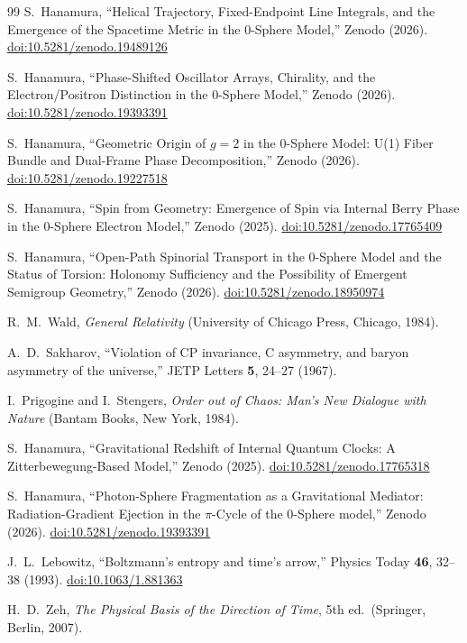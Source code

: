 \documentclass[%
 reprint, amsmath,amssymb, aps, prb, ]{revtex4-2}
\numberwithin{equation}{section}
\begin{document}
\begin{thebibliography}{99}
S.~Hanamura, ``Helical Trajectory, Fixed-Endpoint Line Integrals, and the Emergence of the Spacetime Metric in the 0-Sphere Model,'' Zenodo (2026). \href{https://doi.org/10.5281/zenodo.19489126}{doi:10.5281/zenodo.19489126}

S.~Hanamura, ``Phase-Shifted Oscillator Arrays, Chirality, and the Electron/Positron Distinction in the 0-Sphere Model,'' Zenodo (2026). \href{https://doi.org/10.5281/zenodo.19393391}{doi:10.5281/zenodo.19393391}

S.~Hanamura, ``Geometric Origin of $g=2$ in the 0-Sphere Model: U(1) Fiber Bundle and Dual-Frame Phase Decomposition,'' Zenodo (2026). \href{https://doi.org/10.5281/zenodo.19227518}{doi:10.5281/zenodo.19227518}

S.~Hanamura, ``Spin from Geometry: Emergence of Spin via Internal Berry Phase in the 0-Sphere Electron Model,'' Zenodo (2025). \href{https://doi.org/10.5281/zenodo.17765409}{doi:10.5281/zenodo.17765409}

S.~Hanamura, ``Open-Path Spinorial Transport in the 0-Sphere Model and the Status of Torsion: Holonomy Sufficiency and the Possibility of Emergent Semigroup Geometry,'' Zenodo (2026). \href{https://doi.org/10.5281/zenodo.18950974}{doi:10.5281/zenodo.18950974}

R.~M.~Wald, \textit{General Relativity} (University of Chicago Press, Chicago, 1984).

A.~D.~Sakharov, ``Violation of CP invariance, C asymmetry, and baryon asymmetry of the universe,'' JETP Letters \textbf{5}, 24--27 (1967).

I.~Prigogine and I.~Stengers, \textit{Order out of Chaos: Man's New Dialogue with Nature} (Bantam Books, New York, 1984).

S.~Hanamura, ``Gravitational Redshift of Internal Quantum Clocks: A Zitterbewegung-Based Model,'' Zenodo (2025). \href{https://doi.org/10.5281/zenodo.17765318}{doi:10.5281/zenodo.17765318}

S.~Hanamura, ``Photon-Sphere Fragmentation as a Gravitational Mediator: Radiation-Gradient Ejection in the $\pi$-Cycle of the 0-Sphere model,'' Zenodo (2026). \href{https://doi.org/10.5281/zenodo.19393391}{doi:10.5281/zenodo.19393391}

J.~L.~Lebowitz, ``Boltzmann's entropy and time's arrow,'' Physics Today \textbf{46}, 32--38 (1993). \href{https://doi.org/10.1063/1.881363}{doi:10.1063/1.881363}

H.~D.~Zeh, \textit{The Physical Basis of the Direction of Time}, 5th ed.\ (Springer, Berlin, 2007).

\end{thebibliography}
\end{document}
